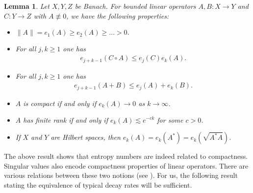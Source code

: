 \documentclass[12pt,twoside]{amsart}
\numberwithin{equation}{section}
\renewcommand{\leq}{\leqslant}
\renewcommand{\geq}{\geqslant}
\newtheorem{lemma}[theorem]{Lemma}
\begin{document}
\begin{lemma}
\label{lem:prop_entropy}
Let $X,Y,Z$ be Banach. For bounded linear operators $A, B: X \to Y$ and $C: Y \to Z$ with $A \not\equiv 0$, we have the following properties:
\begin{itemize}
\item[(i)] $\|A\| = e_1(A) \geq e_2(A)\geq \ldots > 0$.
\item[(ii)] For all $j,k \geq 1$ one has 
\begin{align*}
e_{j+k-1}(C \circ A) \leq e_j(C) e_k(A).
\end{align*}
\item[(iii)] For all $j,k \geq 1$ one has 
\begin{align*}
e_{j+k-1}(A+B) \leq e_j(A) + e_k(B).
\end{align*}
\item[(iv)] $A$ is compact if and only if $e_k(A) \to 0$ as $k \to \infty$.
\item[(v)] $A$ has finite rank if and only if $e_k(A) \lesssim e^{-ck}$ for some $c > 0$.
\item[(vi)] If $X$ and $Y$ are Hilbert spaces, then $e_k(A) = e_k(A^*) = e_k(\sqrt{A^* A})$.
\end{itemize}
\end{lemma}


The above result shows that entropy numbers are indeed related to compactness. Singular values also encode compactness properties of linear operators. There are various relations between these two notions (see \cite{CS90, ET08}). For us, the following result stating the equivalence of typical decay rates will be sufficient.
\end{document}
